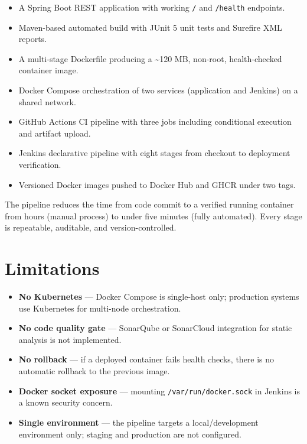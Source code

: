 \documentclass[12pt,a4paper]{report}
\begin{document}
\begin{itemize}[leftmargin=*, label=]
  \item A Spring Boot REST application with working \texttt{/} and \texttt{/health} endpoints.
  \item Maven-based automated build with JUnit 5 unit tests and Surefire XML reports.
  \item A multi-stage Dockerfile producing a \textasciitilde{}120 MB, non-root, health-checked container image.
  \item Docker Compose orchestration of two services (application and Jenkins) on a shared network.
  \item GitHub Actions CI pipeline with three jobs including conditional execution and artifact upload.
  \item Jenkins declarative pipeline with eight stages from checkout to deployment verification.
  \item Versioned Docker images pushed to Docker Hub and GHCR under two tags.
\end{itemize}

The pipeline reduces the time from code commit to a verified running container from hours (manual process) to under five minutes (fully automated). Every stage is repeatable, auditable, and version-controlled.

\section{Limitations}

\begin{itemize}[leftmargin=*, label=--]
  \item \textbf{No Kubernetes} — Docker Compose is single-host only; production systems use Kubernetes for multi-node orchestration.
  \item \textbf{No code quality gate} — SonarQube or SonarCloud integration for static analysis is not implemented.
  \item \textbf{No rollback} — if a deployed container fails health checks, there is no automatic rollback to the previous image.
  \item \textbf{Docker socket exposure} — mounting \texttt{/var/run/docker.sock} in Jenkins is a known security concern.
  \item \textbf{Single environment} — the pipeline targets a local/development environment only; staging and production are not configured.
\end{itemize}
\end{document}

